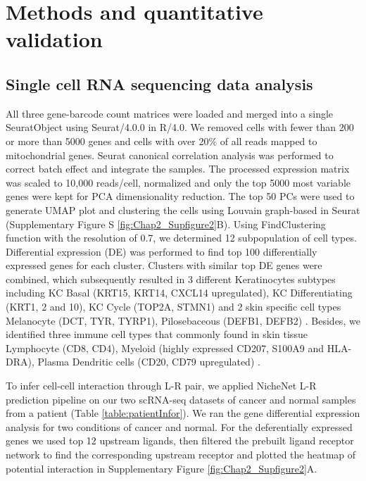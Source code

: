 \section{Methods and quantitative validation}
\label{Sec:2.3_validation}	%
\subsection{Single cell RNA sequencing data analysis}
All three gene-barcode count matrices were loaded and merged into a single SeuratObject using Seurat/4.0.0 in R/4.0. We removed cells with fewer than 200 or more than 5000 genes and cells with over 20\% of all reads mapped to mitochondrial genes. Seurat canonical correlation analysis was performed to correct batch effect and integrate the samples. The processed expression matrix was scaled to 10,000 reads/cell, normalized and only the top 5000 most variable genes were kept for PCA dimensionality reduction. The top 50 PCs were used to generate UMAP plot and clustering the cells using Louvain graph-based in Seurat (Supplementary Figure S \ref{fig:Chap2_Supfigure2}B). Using FindClustering function with the resolution of 0.7, we determined 12 subpopulation of cell types. Differential expression (DE) was performed to find top 100 differentially expressed genes for each cluster. Clusters with similar top DE genes were combined, which subsequently resulted in 3 different Keratinocytes subtypes including KC Basal (KRT15, KRT14, CXCL14  upregulated), KC Differentiating (KRT1, 2 and 10), KC Cycle (TOP2A, STMN1)  \cite{joost2016single, ji2020multimodal} and 2 skin specific cell types Melanocyte (DCT, TYR, TYRP1), Pilosebaceous (DEFB1, DEFB2) \cite{belote2021human}. Besides, we identified three immune cell types that commonly found in skin tissue  Lymphocyte (CD8, CD4), Myeloid (highly expressed CD207, S100A9 and HLA-DRA), Plasma Dendritic cells (CD20, CD79 upregulated) \cite{ji2020multimodal}.          

To infer cell-cell interaction through L-R pair, we applied NicheNet L-R prediction pipeline \cite{browaeys2020nichenet} on our two scRNA-seq datasets of cancer and normal samples from a patient (Table \ref{table:patientInfor}). We ran the gene differential expression analysis for two conditions of cancer and normal. For the deferentially expressed genes we used top 12 upstream ligands, then filtered the prebuilt ligand receptor network to find the corresponding upstream receptor and plotted the heatmap of potential interaction in Supplementary Figure \ref{fig:Chap2_Supfigure2}A.

